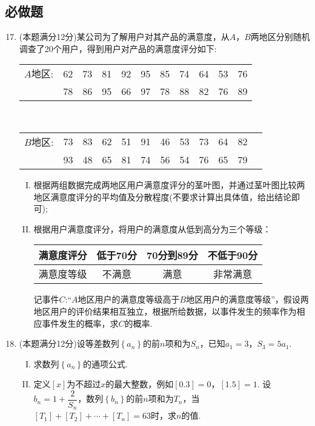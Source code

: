 \documentclass[11pt]{article}
\begin{document}
\subsection{\heiti 必做题}
\begin{enumerate}
	\setcounter{enumi}{16}
	\item (本题满分12分)某公司为了解用户对其产品的满意度，从$ A $，$ B $两地区分别随机调查了20个用户，得到用户对产品的满意度评分如下:
	\\
	\begin{tabular}{ccccccccccc}
	$ A $地区: &	62 & 73 & 81 & 92 & 95 & 85 & 74 & 64 & 53 & 76\\
	 &	78 & 86 & 95 & 66 & 97 & 78 & 88 & 82 & 76 & 89 
	\end{tabular}
	\\
	\begin{tabular}{cccccccccccc}
		$ B $地区:  & 73 &  83&  62&  51& 91 & 46 & 53 & 73 & 64 & 82\\
		& 93 & 48 & 65 & 81 & 74 & 56 & 54 & 76 & 65 &79
	\end{tabular}
	\begin{enumerate}[(I)]
		\item 根据两组数据完成两地区用户满意度评分的茎叶图，并通过茎叶图比较两地区满意度评分的平均值及分散程度(不要求计算出具体值，给出结论即可);
		\item 根据用户满意度评分，将用户的满意度从低到高分为三个等级：
		\begin{center}
			\begin{tabular}{c|c|c|c}
				\hline
				满意度评分 & 低于70分 & 70分到89分 & 不低于90分\\
				\hline
				满意度等级 & 不满意 & 满意 & 非常满意\\
				\hline
			\end{tabular}
		\end{center}
		记事件$ C $:“$ A $地区用户的满意度等级高于$ B $地区用户的满意度等级”，假设两地区用户的评价结果相互独立，根据所给数据，以事件发生的频率作为相应事件发生的概率，求$ C $的概率.
	\end{enumerate}
	

	\item (本题满分12分)设等差数列$ \left \{ a_n \right \} $的前$ n $项和为$ S_n $，已知$ a_1=3 $，$ S_3=5a_1 $.
	\begin{enumerate}[(I)]
		\item 求数列$ \left \{ a_n \right \} $的通项公式.
		\item 定义$ \left [ x \right ]  $为不超过$x$的最大整数，例如$[0.3]=0$，$[1.5]=1$. 设$ b_n=1+\dfrac{2}{S_n} $，数列$ \left \{ b_n \right \} $的前$n$项和为$T_n$，当$ \left [ T_1 \right ]+ \left [ T_2 \right ]+\cdots+\left [ T_n \right ]=63 $时，求$n$的值.
	\end{enumerate}


\end{enumerate}
\end{document}
